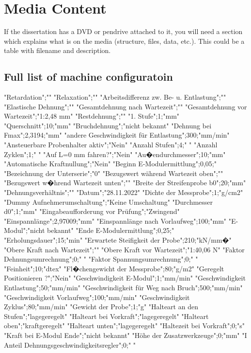 \chapter{Media Content}

If the dissertation has a DVD or pendrive attached to it, you will need a section which explains what is on the media (structure, files, data, etc.).  This could be a table with filename and description.

\blindtext[5]

\section*{Full list of machine configuratoin}
"Retardation";""
"Relaxation";""
"Arbeitsdifferenz zw. Be- u. Entlastung";""
"Elastische Dehnung";""
"Gesamtdehnung nach Wartezeit";""
"Gesamtdehnung vor Wartezeit";"1:2,48 mm"
"Restdehnung";""
"1. Stufe";1;"mm"
"Querschnitt";10;"mm"
"Bruchdehnung";"nicht bekannt"
"Dehnung bei Fmax";2,3194;"mm"
"andere Geschwindigkeit für Entlastung";300;"mm/min"
"Ansteuerbare Probenhalter aktiv";"Nein"
"Anzahl Stufen";4;" "
"Anzahl Zyklen";1;" "
"Auf L=0 mm fahren?";"Nein"
"Au�endurchmesser";10;"mm"
"Automatische Kraftnullung";"Nein"
"Beginn E-Modulermittlung";0,05;"%
"Bezeichnung der Unterserie";"0"
"Bezugswert während Wartezeit oben";""
"Bezugswert w�hrend Wartezeit unten";""
"Breite der Streifenprobe b0";20;"mm"
"Dehnungsverhältnis";""
"Datum";"28.11.2022"
"Dichte der Messprobe";1;"g/cm2"
"Dummy Aufnehmerumschaltung";"Keine Umschaltung"
"Durchmesser d0";1;"mm"
"Eingabeaufforderung vor Prüfung";"Zwingend"
"Einspannlänge";2,97009;"mm"
"Einspannlänge nach Vorlaufweg";100;"mm"
"E-Modul";"nicht bekannt"
"Ende E-Modulermittlung";0,25;"%
"Erholungsdauer";15;"min"
"Erwartete Steifigkeit der Probe";210;"kN/mm�"
"Obere Kraft nach Wartezeit";""
"Obere Kraft vor Wartezeit";"1:40,06 N"
"Faktor Dehnungsumrechnung";0;" "
"Faktor Spannungsumrechnung";0;" "
"Feinheit";10;"dtex"
"Fl�chengewicht der Messprobe";80;"g/m2"
"Geregelt Positionieren ?";"Nein"
"Geschwindigkeit E-Modul";1;"mm/min"
"Geschwindigkeit Entlastung";50;"mm/min"
"Geschwindigkeit für Weg nach Bruch";500;"mm/min"
"Geschwindigkeit Vorlaufweg";100;"mm/min"
"Geschwindigkeit Zyklus";80;"mm/min"
"Gewicht der Probe";1;"g"
"Halteart an den Stufen";"lagegeregelt"
"Halteart bei Vorkraft";"lagegeregelt"
"Halteart oben";"kraftgeregelt"
"Halteart unten";"lagegeregelt"
"Haltezeit bei Vorkraft";0;"s"
"Kraft bei E-Modul Ende";"nicht bekannt"
"Höhe der Zusatzwerkzeuge";0;"mm"
"I Anteil Dehnungsgeschwindigkeitsregler";0;" "
